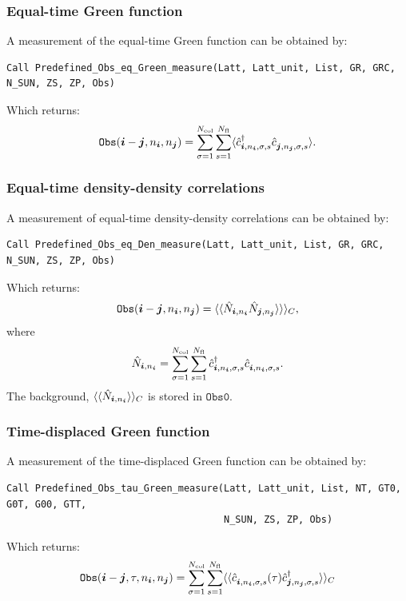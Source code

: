 \subsubsection{Equal-time Green function}

A measurement of the equal-time Green function can be obtained by:
\begin{lstlisting}[style=fortran]
Call Predefined_Obs_eq_Green_measure(Latt, Latt_unit, List, GR, GRC, N_SUN, ZS, ZP, Obs)
\end{lstlisting}

Which returns:
\begin{align}
\texttt{Obs}(\ve{i}-\ve{j}, n_{\ve{i}}, n_{\ve{j}}) = \sum_{\sigma=1}^{N_\text{col}} \sum_{s=1}^{N_\text{fl}} \langle  \hat{c}^{\dagger}_{\ve{i}, n_{\ve{i}},\sigma,s} \hat{c}^{\phantom\dagger}_{\ve{j}, n_{\ve{j}},\sigma,s} \rangle.
\end{align}


\subsubsection{Equal-time density-density correlations}

A measurement of equal-time density-density correlations can be obtained by:
\begin{lstlisting}[style=fortran]
Call Predefined_Obs_eq_Den_measure(Latt, Latt_unit, List, GR, GRC, N_SUN, ZS, ZP, Obs)
\end{lstlisting}
Which returns:
\begin{align}
\texttt{Obs}(\boldsymbol{i}-\boldsymbol{j}, n_{\boldsymbol{i}}, n_{\boldsymbol{j}}) = \langle  \langle\hat{ N}_{\boldsymbol{i},n_{\boldsymbol{i}}}  \hat{N}_{\boldsymbol{j},n_{\boldsymbol{j}}}\rangle \rangle \rangle_C,
\end{align}
where
\begin{align}
\label{Density_op.eq}
\hat{N}_{\ve{i},n_{\ve{i}}}  = \sum_{\sigma=1}^{N_\text{col}} \sum_{s=1}^{N_\text{fl}}  \hat{c}^{\dagger}_{\ve{i},n_{\ve{i}},\sigma,s} \hat{c}^{\phantom\dagger}_{\ve{i}, n_{\ve{i}},\sigma,s}.
\end{align}
The  background,   $\langle  \langle\hat{ N}_{\boldsymbol{i},n_{\boldsymbol{i}}} \rangle \rangle_C$   is  stored  in  $\texttt{Obs0}$. 

\subsubsection{Time-displaced Green function}

A measurement of the time-displaced Green function can be obtained by:
\begin{lstlisting}[style=fortran]
Call Predefined_Obs_tau_Green_measure(Latt, Latt_unit, List, NT, GT0, G0T, G00, GTT, 
                                      N_SUN, ZS, ZP, Obs)
\end{lstlisting}
Which returns:
\begin{align}
\texttt{Obs}(\ve{i} - \ve{j}, \tau, n_{\ve{i}},  n_{\ve{j}} )  = \sum_{\sigma=1}^{N_\text{col}} \sum_{s=1}^{N_\text{fl}} \langle \langle  \hat{c}^{\phantom\dagger}_{\ve{i},n_{\ve{i}},  \sigma,s}(\tau) \hat{c}^{\dagger}_{\ve{j}, n_{\ve{j}},\sigma,s} \rangle \rangle_{C}
\end{align}


